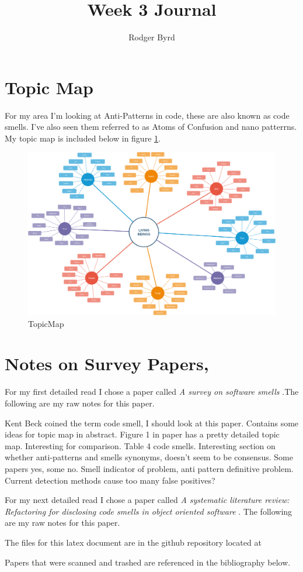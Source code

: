 \documentclass[conference]{IEEEtran}
\begin{document}

\title{Week 3 Journal}
\author{Rodger Byrd}
\maketitle


\section{Topic Map}
For my area I'm looking at Anti-Patterns in code, these are also known as code smells. I've also seen them referred to as Atoms of Confusion and nano patterrns. My topic map is included below in figure \ref{fig:TM}. 
\begin{figure}
  \centerline{\includegraphics[width=\textwidth]{codesmells.png}}
  \caption{TopicMap}
  \label{fig:TM}
\end{figure} 

\section{Notes on Survey Papers, }
For my first detailed read I chose a paper called  \textit{A survey on software smells} \cite{sharma_survey_2018}.The following are my raw notes for this paper.

Kent Beck coined the term code smell, I should look at this paper.
Contains some ideas for topic map in abstract.
Figure 1 in paper has a pretty detailed topic map.
Interesting for comparison.
Table 4 code smells.
Interesting section on whether anti-patterns and smells synonyms, doesn't seem to be consensus. Some papers yes, some no.
Smell indicator of problem, anti pattern definitive problem.
Current detection methods cause too many false positives?


For my next detailed read I chose a paper called  \textit{A systematic literature review: Refactoring for disclosing code smells in object oriented software} \cite{singh_systematic_2018}. The following are my raw notes for this paper.


The files for this latex document are in the github repository located at 

Papers that were scanned and trashed are referenced in the bibliography below. 
\nocite{*}



\end{document}
